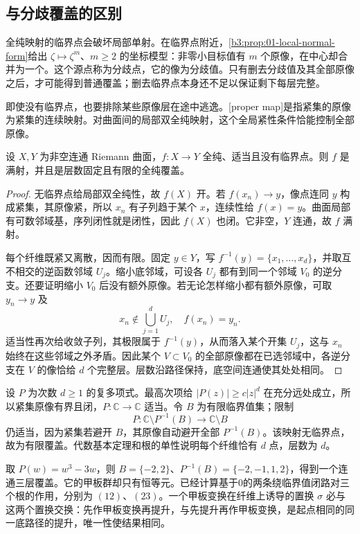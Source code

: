 \subsection{与分歧覆盖的区别}
\label{b3:subsec:110204}

全纯映射的临界点会破坏局部单射。在临界点附近，\cref{b3:prop:01-local-normal-form}给出 \(\zeta\mapsto\zeta^m\)、\(m\ge2\) 的坐标模型：非零小目标值有 \(m\) 个原像，在中心却合并为一个。这个源点称为分歧点，它的像为分歧值。只有删去分歧值及其全部原像之后，才可能得到普通覆盖；删去临界点本身还不足以保证剩下每层完整。

\ProseParagraphBreak
即使没有临界点，也要排除某些原像层在途中逃逸。[proper map]是指紧集的原像为紧集的连续映射。对曲面间的局部双全纯映射，这个全局紧性条件恰能控制全部原像。

\begin{proposition}[适当的无临界点映射]\label{b3:prop:11-proper-unbranched}
设 \(X,Y\) 为非空连通 Riemann 曲面，\(f:X\to Y\) 全纯、适当且没有临界点。则 \(f\) 是满射，并且是层数固定且有限的全纯覆盖。
\end{proposition}
\begin{proof}
无临界点给局部双全纯性，故 \(f(X)\) 开。若 \(f(x_n)\to y\)，像点连同 \(y\) 构成紧集，其原像紧，所以 \(x_n\) 有子列趋于某个 \(x\)，连续性给 \(f(x)=y\)。曲面局部有可数邻域基，序列闭性就是闭性，因此 \(f(X)\) 也闭。它非空，\(Y\) 连通，故 \(f\) 满射。

每个纤维既紧又离散，因而有限。固定 \(y\in Y\)，写 \(f^{-1}(y)=\{x_1,\ldots,x_d\}\)，并取互不相交的逆函数邻域 \(U_j\)。缩小底邻域，可设各 \(U_j\) 都有到同一个邻域 \(V_0\) 的逆分支。还要证明缩小 \(V_0\) 后没有额外原像。若无论怎样缩小都有额外原像，可取 \(y_n\to y\) 及
\[
 x_n\notin\bigcup_{j=1}^d U_j,\quad f(x_n)=y_n.
\]
适当性再次给收敛子列，其极限属于 \(f^{-1}(y)\)，从而落入某个开集 \(U_j\)，这与 \(x_n\) 始终在这些邻域之外矛盾。因此某个 \(V\subset V_0\) 的全部原像都在已选邻域中，各逆分支在 \(V\) 的像恰给 \(d\) 个完整层。层数沿路径保持，底空间连通使其处处相同。
\end{proof}
设 \(P\) 为次数 \(d\ge1\) 的复多项式。最高次项给 \(|P(z)|\ge c|z|^d\) 在充分远处成立，所以紧集原像有界且闭，\(P:\mathbb C\to\mathbb C\) 适当。令 \(B\) 为有限临界值集；限制
\[
 P:\mathbb C\setminus P^{-1}(B)\longrightarrow\mathbb C\setminus B
\]
仍适当，因为紧集若避开 \(B\)，其原像自动避开全部 \(P^{-1}(B)\)。该映射无临界点，故为有限覆盖。代数基本定理和根的单性说明每个纤维恰有 \(d\) 点，层数为 \(d\)。

\ProseParagraphBreak
取 \(P(w)=w^3-3w\)，则 \(B=\{-2,2\}\)、\(P^{-1}(B)=\{-2,-1,1,2\}\)，得到一个连通三层覆盖。它的甲板群却只有恒等元。已经计算基于0的两条绕临界值闭路对三个根的作用，分别为 \((12)\)、\((23)\)。一个甲板变换在纤维上诱导的置换 \(\sigma\) 必与这两个置换交换：先作甲板变换再提升，与先提升再作甲板变换，是起点相同的同一底路径的提升，唯一性使结果相同。

